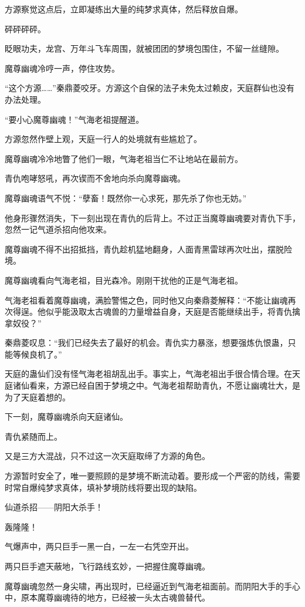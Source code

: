 \begin{this_body}
方源察觉这点后，立即凝练出大量的纯梦求真体，然后释放自爆。

砰砰砰砰。

眨眼功夫，龙宫、万年斗飞车周围，就被团团的梦境包围住，不留一丝缝隙。

魔尊幽魂冷哼一声，停住攻势。

“这个方源……”秦鼎菱咬牙。方源这个自保的法子未免太过赖皮，天庭群仙也没有办法处理。

“要小心魔尊幽魂！”气海老祖提醒道。

方源忽然作壁上观，天庭一行人的处境就有些尴尬了。

魔尊幽魂冷冷地瞥了他们一眼，气海老祖当仁不让地站在最前方。

青仇咆哮怒吼，再次锲而不舍地向杀向魔尊幽魂。

魔尊幽魂语气不悦：“孽畜！既然你一心求死，那先杀了你也无妨。”

他身形骤然消失，下一刻出现在青仇的后背上。不过正当魔尊幽魂要对青仇下手，忽然一记气道杀招向他攻来。

魔尊幽魂不得不出招抵挡，青仇趁机猛地翻身，人面青黑雷球再次吐出，摆脱险境。

魔尊幽魂看向气海老祖，目光森冷。刚刚干扰他的正是气海老祖。

气海老祖看着魔尊幽魂，满脸警惕之色，同时他又向秦鼎菱解释：“不能让幽魂再次得逞。他似乎能汲取太古魂兽的力量增益自身，天庭是否能继续出手，将青仇擒拿奴役？”

秦鼎菱叹息：“我们已经失去了最好的机会。青仇实力暴涨，想要强炼仇恨蛊，只能等候良机了。”

天庭的蛊仙们没有怪气海老祖胡乱出手。事实上，气海老祖出手很合情合理。在天庭诸仙看来，方源已经自困于梦境之中。气海老祖帮助青仇，不愿让幽魂壮大，是为了天庭着想的。

下一刻，魔尊幽魂杀向天庭诸仙。

青仇紧随而上。

又是三方大混战，只不过这一次天庭取缔了方源的角色。

方源暂时安全了，唯一要照顾的是梦境不断流动着。要形成一个严密的防线，需要时常自爆纯梦求真体，填补梦境防线将要出现的缺陷。

仙道杀招——阴阳大杀手！

轰隆隆！

气爆声中，两只巨手一黑一白，一左一右凭空开出。

两只巨手遮天蔽地，飞行路线玄妙，一把握住魔尊幽魂。

魔尊幽魂忽然一身尖啸，再出现时，已经逼近到气海老祖面前。而阴阳大手的手心中，原本魔尊幽魂待的地方，已经被一头太古魂兽替代。


\end{this_body}
